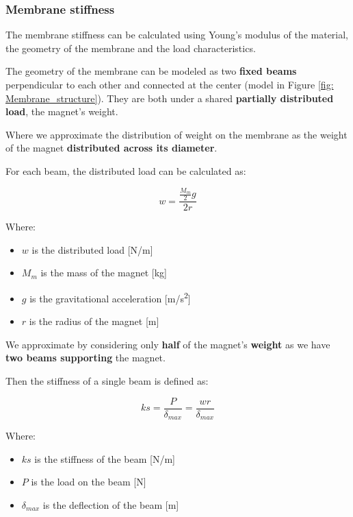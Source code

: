 \subsubsection{Membrane stiffness}
\label{sec: Membrane_stiffness}
The membrane stiffness can be calculated using Young's modulus of the material, the geometry of the membrane and the load characteristics.

The geometry of the membrane can be modeled as two \textbf{fixed beams} perpendicular to each other and connected at the center (model in Figure \ref{fig: Membrane_structure}).
They are both under a shared \textbf{partially distributed load}, the magnet's weight.

Where we approximate the distribution of weight on the membrane as the weight of the magnet \textbf{distributed across its diameter}.

\begin{samepage}
    For each beam, the distributed load can be calculated as:
    \nopagebreak

    \begin{equation*}
        w = \frac{\frac{M_{m}}{2} g}{2 r}
    \end{equation*}
    \nopagebreak

    Where:
    \nopagebreak

    \begin{itemize}
        \item $w$ is the distributed load [N/m]
        \item $M_m$ is the mass of the magnet [kg]
        \item $g$ is the gravitational acceleration [m/s\textsuperscript{2}]
        \item $r$ is the radius of the magnet [m]
    \end{itemize}
\end{samepage}


We approximate by considering only \textbf{half} of the magnet's \textbf{weight} as we have \textbf{two beams supporting} the magnet.

\begin{samepage}
    Then the stiffness of a single beam is defined as:
    \nopagebreak

    \begin{equation*}
        ks = \frac{P}{\delta_{max}} = \frac{w r}{\delta_{max}}
    \end{equation*}
    \nopagebreak

    Where:
    \nopagebreak

    \begin{itemize}
        \item $ks$ is the stiffness of the beam [N/m]
        \item $P$ is the load on the beam [N]
        \item $\delta_{max}$ is the deflection of the beam [m]
    \end{itemize}
\end{samepage}


